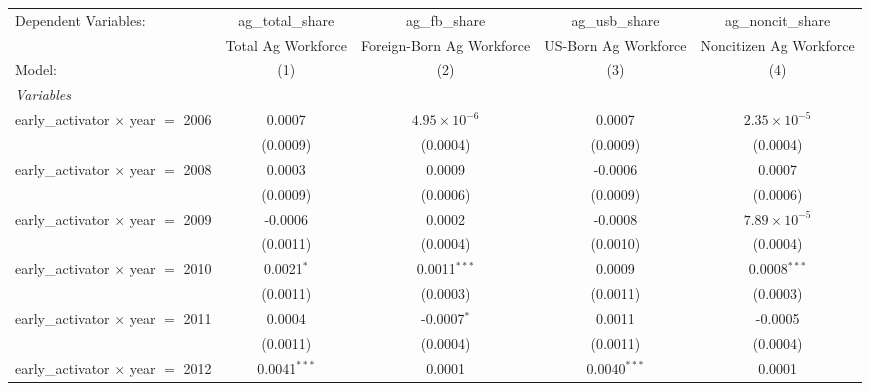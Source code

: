 
\begingroup
\centering
\begin{tabular}{lcccc}
   \tabularnewline \midrule \midrule
   Dependent Variables:                      & ag\_total\_share   & ag\_fb\_share             & ag\_usb\_share       & ag\_noncit\_share\\    
                                             & Total Ag Workforce & Foreign-Born Ag Workforce & US-Born Ag Workforce & Noncitizen Ag Workforce \\   
   Model:                                    & (1)                & (2)                       & (3)                  & (4)\\  
   \midrule
   \emph{Variables}\\
   early\_activator $\times$ year $=$ 2006   & 0.0007             & $4.95\times 10^{-6}$      & 0.0007               & $2.35\times 10^{-5}$\\    
                                             & (0.0009)           & (0.0004)                  & (0.0009)             & (0.0004)\\   
   early\_activator $\times$ year $=$ 2008   & 0.0003             & 0.0009                    & -0.0006              & 0.0007\\   
                                             & (0.0009)           & (0.0006)                  & (0.0009)             & (0.0006)\\   
   early\_activator $\times$ year $=$ 2009   & -0.0006            & 0.0002                    & -0.0008              & $7.89\times 10^{-5}$\\    
                                             & (0.0011)           & (0.0004)                  & (0.0010)             & (0.0004)\\   
   early\_activator $\times$ year $=$ 2010   & 0.0021$^{*}$       & 0.0011$^{***}$            & 0.0009               & 0.0008$^{***}$\\   
                                             & (0.0011)           & (0.0003)                  & (0.0011)             & (0.0003)\\   
   early\_activator $\times$ year $=$ 2011   & 0.0004             & -0.0007$^{*}$             & 0.0011               & -0.0005\\   
                                             & (0.0011)           & (0.0004)                  & (0.0011)             & (0.0004)\\   
   early\_activator $\times$ year $=$ 2012   & 0.0041$^{***}$     & 0.0001                    & 0.0040$^{***}$       & 0.0001\\   

\end{tabular}
